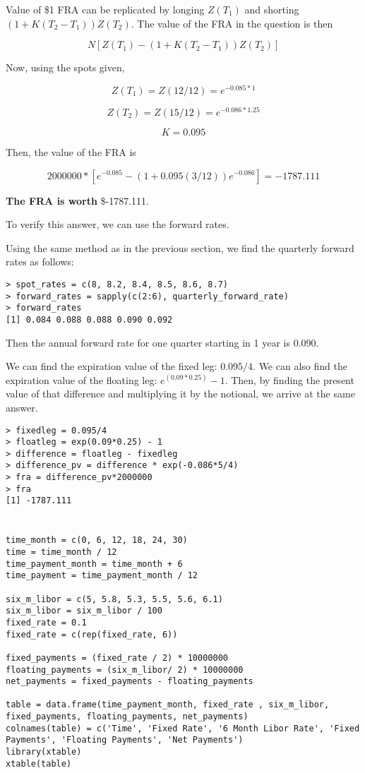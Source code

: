 \documentclass[11pt]{scrartcl}
\newcommand{\epower}[1]{\ensuremath{e^{\left(#1\right)}}}
\newcommand{\epowernb}[1]{\ensuremath{e^{#1}}}
\begin{document}
Value of \$1 FRA can be replicated by longing $Z(T_1)$ and shorting $(1+K(T_2 - T_1))Z(T_2)$. The value of the FRA in the question is then

\[N\left[Z(T_1) -  (1+K(T_2 - T_1))Z(T_2)\right]\]

Now, using the spots given,

\[Z(T_1) = Z(12/12) = \epowernb{-0.085*1}\]

\[Z(T_2) = Z(15/12) = \epowernb{-0.086*1.25}\]

\[K = 0.095\]

Then, the value of the FRA is

\[2000000 * \left[\epowernb{-0.085} - (1+0.095(3/12))\epowernb{-0.086} \right] = -1787.111\]

\textbf{The FRA is worth} \$-1787.111.

To verify this answer, we can use the forward rates.

Using the same method as in the previous section, we find the quarterly forward rates as follows:

\begin{lstlisting}
> spot_rates = c(8, 8.2, 8.4, 8.5, 8.6, 8.7)
> forward_rates = sapply(c(2:6), quarterly_forward_rate)
> forward_rates
[1] 0.084 0.088 0.088 0.090 0.092
\end{lstlisting}

Then the annual forward rate for one quarter starting in 1 year is 0.090.

We can find the expiration value of the fixed leg: $0.095/4$. We can also find the expiration value of the floating leg: $\epower{0.09*0.25} - 1$. Then, by finding the present value of that difference and multiplying it by the notional, we arrive at the same answer.

\begin{lstlisting}
> fixedleg = 0.095/4
> floatleg = exp(0.09*0.25) - 1
> difference = floatleg - fixedleg
> difference_pv = difference * exp(-0.086*5/4)
> fra = difference_pv*2000000
> fra
[1] -1787.111
\end{lstlisting}

\section{}

\begin{lstlisting}
time_month = c(0, 6, 12, 18, 24, 30)
time = time_month / 12
time_payment_month = time_month + 6
time_payment = time_payment_month / 12

six_m_libor = c(5, 5.8, 5.3, 5.5, 5.6, 6.1)
six_m_libor = six_m_libor / 100
fixed_rate = 0.1
fixed_rate = c(rep(fixed_rate, 6))

fixed_payments = (fixed_rate / 2) * 10000000
floating_payments = (six_m_libor/ 2) * 10000000
net_payments = fixed_payments - floating_payments

table = data.frame(time_payment_month, fixed_rate , six_m_libor, fixed_payments, floating_payments, net_payments)
colnames(table) = c('Time', 'Fixed Rate', '6 Month Libor Rate', 'Fixed Payments', 'Floating Payments', 'Net Payments')
library(xtable)
xtable(table)
\end{lstlisting}
\end{document}
